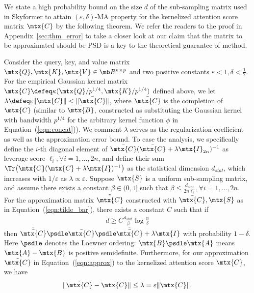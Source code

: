 We state a high probability bound on the size $d$ of the sub-sampling matrix used in Skyformer to attain $(\varepsilon, \delta)$-MA property for the kernelized attention score matrix $\mtx{C}$ by the following theorem.
We refer the readers to the proof in Appendix~\ref{sec:thm_error} to take a closer look at our claim that the matrix to be approximated should be PSD is a key to the theoretical guarantee of \nystrom method.
\begin{thm}
\label{thm:tilde_K}
Consider the query, key, and value matrix $\mtx{Q}, \mtx{K}, \mtx{V} \in \mb R^{n \times p}$ and two positive constants $\varepsilon < 1, \delta < \frac12$.
For the empirical Gaussian kernel matrix $\mtx{C} \defeq \kappa(\mtx{Q} / p^{1/4}, \mtx{K} / p^{1/4})$ defined above, 
we let $\lambda \defeq \varepsilon \|\mtx{C}\| < \|\bar{\mtx{C}}\|$, where $\bar{\mtx{C}}$ is the completion of $\mtx{C}$ (similar to $\bar{\mtx{B}}$, constructed as substituting the Gaussian kernel with bandwidth $p^{1/4}$ for the arbitrary kernel function $\phi$ in Equation~(\ref{eqn:concat})).
We comment $\lambda$ serves as the regularization coefficient as well as the approximation error bound. 
To ease the analysis, we specifically define the $i$-th diagonal element of $\bar{\mtx{C}} (\bar{\mtx{C}} + \lambda \mtx{I}_{2n})^{-1}$ as leverage score $\ell_i, \forall i = 1,\dots, 2n$, 
and define their sum $\Tr \big( \bar{\mtx{C}} (\bar{\mtx{C}} + \lambda \mtx{I})^{-1} \big)$ as the statistical dimension $d_{stat}$,
which increases with $1 / \varepsilon$ as $\lambda \propto \varepsilon$. 
Suppose $\mtx{S}$ is a uniform sub-sampling matrix, 
and assume there exists a constant $\beta \in (0, 1]$ such that $\beta \leq \frac{d_{stat}}{2n \ell_i}, \forall i = 1,\dots,2n$. 
For the approximation matrix $\tilde{\bar{\mtx{C}}}$ constructed with $\bar{\mtx{C}}, \mtx{S}$ as in Equation~(\ref{eqn:tilde_bar}), 
there exists a constant $C$ such that if
\begin{align*}
d \geq C \frac{d_{stat}}{\beta} \log \frac{n}{\delta}
\end{align*}
then $\tilde{\bar{\mtx{C}}} \psdle \bar{\mtx{C}} \psdle \tilde{\bar{\mtx{C}}} + \lambda \mtx{I}$ with probability $1-\delta$.
Here $\psdle$ denotes the Loewner ordering: $\mtx{B} \psdle \mtx{A}$ means $\mtx{A} - \mtx{B}$ is positive semidefinite.
Furthermore, for our approximation $\tilde{\mtx{C}}$ in Equation~(\ref{eqn:approx}) to the kernelized attention score $\mtx{C}$, we have 
\begin{align*}
\|\tilde{\mtx{C}} - \mtx{C}\| \leq \lambda = \varepsilon \|\mtx{C}\|.
\end{align*}
\end{thm}

